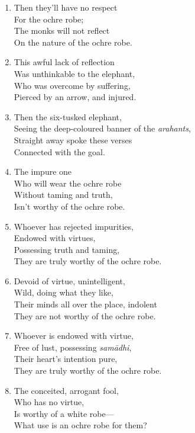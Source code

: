 \documentclass[10pt, openany]{book}
\begin{document}
\begin{enumerate}
\item Then they’ll have no respect\\
For the ochre robe;\\
The monks will not reflect\\
On the nature of the ochre robe.

\item This awful lack of reflection\\
Was unthinkable to the elephant,\\
Who was overcome by suffering,\\
Pierced by an arrow, and injured.

\item Then the six-tusked elephant,\\
Seeing the deep-coloured banner of the \emph{arahants},\\
Straight away spoke these verses\\
Connected with the goal.

\item The impure one\\
Who will wear the ochre robe\\
Without taming and truth,\\
Isn’t worthy of the ochre robe.

\item Whoever has rejected impurities,\\
Endowed with virtues,\\
Possessing truth and taming,\\
They are truly worthy of the ochre robe.

\item Devoid of virtue, unintelligent,\\
Wild, doing what they like,\\
Their minds all over the place, indolent\\
They are not worthy of the ochre robe.

\item Whoever is endowed with virtue,\\
Free of lust, possessing \emph{samādhi},\\
Their heart’s intention pure,\\
They are truly worthy of the ochre robe.

\item The conceited, arrogant fool,\\
Who has no virtue,\\
Is worthy of a white robe—\\
What use is an ochre robe for them?


\end{enumerate}
\end{document}
